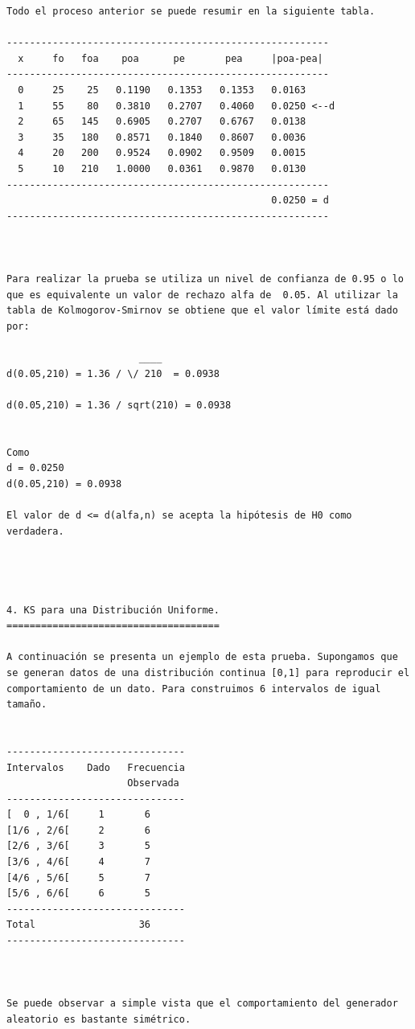 \begin{verbatim}
Todo el proceso anterior se puede resumir en la siguiente tabla.

--------------------------------------------------------
  x     fo   foa    poa      pe       pea     |poa-pea|
--------------------------------------------------------
  0     25    25   0.1190   0.1353   0.1353   0.0163
  1     55    80   0.3810   0.2707   0.4060   0.0250 <--d
  2     65   145   0.6905   0.2707   0.6767   0.0138
  3     35   180   0.8571   0.1840   0.8607   0.0036
  4     20   200   0.9524   0.0902   0.9509   0.0015
  5     10   210   1.0000   0.0361   0.9870   0.0130
--------------------------------------------------------
                                              0.0250 = d
--------------------------------------------------------
                                              
                                              
                                              
Para realizar la prueba se utiliza un nivel de confianza de 0.95 o lo que es equivalente un valor de rechazo alfa de  0.05. Al utilizar la tabla de Kolmogorov-Smirnov se obtiene que el valor límite está dado por:

                       ____
d(0.05,210) = 1.36 / \/ 210  = 0.0938

d(0.05,210) = 1.36 / sqrt(210) = 0.0938


Como 
d = 0.0250 
d(0.05,210) = 0.0938

El valor de d <= d(alfa,n) se acepta la hipótesis de H0 como verdadera.




4. KS para una Distribución Uniforme.
=====================================

A continuación se presenta un ejemplo de esta prueba. Supongamos que se generan datos de una distribución continua [0,1] para reproducir el comportamiento de un dato. Para construimos 6 intervalos de igual tamaño.


-------------------------------
Intervalos    Dado   Frecuencia
                     Observada
-------------------------------
[  0 , 1/6[     1       6
[1/6 , 2/6[     2       6
[2/6 , 3/6[     3       5
[3/6 , 4/6[     4       7
[4/6 , 5/6[     5       7
[5/6 , 6/6[     6       5
-------------------------------
Total                  36
-------------------------------



Se puede observar a simple vista que el comportamiento del generador aleatorio es bastante simétrico.



\end{verbatim}
